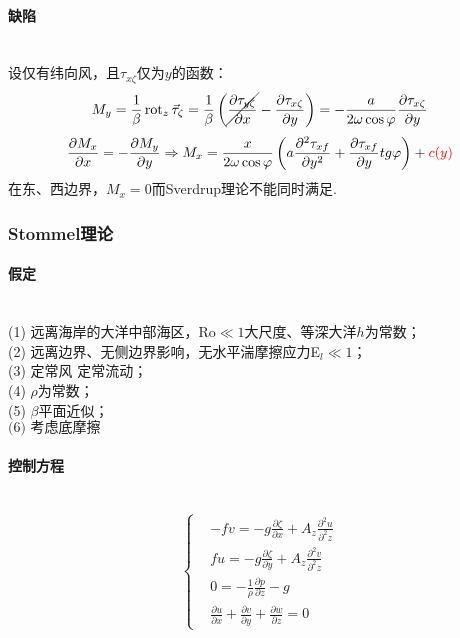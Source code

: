 \documentclass[a4paper,12pt]{article}
\begin{document}
    \paragraph{缺陷}~{}\\
    设仅有纬向风，且$\tau_{x\zeta}$仅为$y$的函数：
    \[
        M_y=\frac{1}{\beta}\operatorname{rot}_z\vec{\tau}_\zeta=\frac{1}{\beta}\left(\cancel{\frac{\partial \tau_{y\zeta}}{\partial x}}-\frac{\partial \tau_{x\zeta}}{\partial y}\right)=-\frac{a}{2\omega\cos\varphi}\frac{\partial\tau_{x\zeta}}{\partial y}
    \]
    \[
        \frac{\partial M_{x}}{\partial x}=-\frac{\partial M_{y}}{\partial y}\Rightarrow M_{x}=\frac{x}{2 \omega \cos \varphi}\left(a \frac{\partial^{2} \tau_{x f}}{\partial y^{2}}+\frac{\partial \tau_{x f}}{\partial y} t g \varphi\right)+{\color{red}c(y)}
    \]
    在东、西边界，$M_x=0$而Sverdrup理论不能同时满足.
    \subsubsection{Stommel理论}
    \paragraph{假定}~{}\\
    (1) 远离海岸的大洋中部海区，Ro$\ll 1$大尺度、等深大洋$h$为常数；\\
    (2) 远离边界、无侧边界影响，无水平湍摩擦应力E$_l\ll 1$；\\
    (3) 定常风 定常流动；\\
    (4) $\rho$为常数；\\
    (5) $\beta$平面近似；\\
    $\mbox{(6) 考虑底摩擦}$
    \paragraph{控制方程}~{}
    \[
        \left\{
            \begin{aligned}
                &-f v=-g \frac{\partial \zeta}{\partial x}+A_{z} \frac{\partial^{2} u}{\partial^{2} z} \\
                &fu=-g \frac{\partial \zeta}{\partial y}+A_{z} \frac{\partial^{2} v}{\partial^{2} z} \\
                &0=-\frac{1}{\rho} \frac{\partial p}{\partial z}-g\\
                &\frac{\partial u}{\partial x}+\frac{\partial v}{\partial y}+\frac{\partial w}{\partial z}=0
            \end{aligned}
        \right.
    \]
\end{document}
